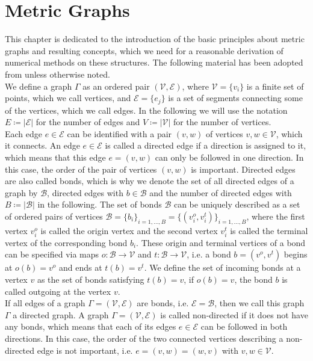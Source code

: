 \section{Metric Graphs}
\label{ch1:sec1}

This chapter is dedicated to the introduction of the basic principles about metric graphs and resulting concepts, which we need for a reasonable derivation of numerical methods on these structures. The following material has been adopted from \cite[chapter~1]{BerkolaikoKuchment:2013} unless otherwise noted. \\

We define a graph $\Gamma$ as an ordered pair $(\mathcal{V}, \mathcal{E})$, where $\mathcal{V} = \{v_i\}$ is a finite set of points, which we call vertices, and $\mathcal{E} = \{e_j\}$ is a set of segments connecting some of the vertices, which we call edges. In the following we will use the notation $E \coloneqq \left\lvert \mathcal{E} \right\rvert$ for the number of edges and $V \coloneqq \left\lvert \mathcal{V} \right\rvert$ for the number of vertices. \\
Each edge $e \in \mathcal{E}$ can be identified with a pair $(v, w)$ of vertices $v, w \in \mathcal{V}$, which it connects. An edge $e \in \mathcal{E}$ is called a directed edge if a direction is assigned to it, which means that this edge $e = (v, w)$ can only be followed in one direction. In this case, the order of the pair of vertices $(v, w)$ is important. Directed edges are also called bonds, which is why we denote the set of all directed edges of a graph by $\mathcal{B}$, directed edges with $b \in \mathcal{B}$ and the number of directed edges with $B \coloneqq \left\lvert \mathcal{B} \right\rvert$ in the following. The set of bonds $\mathcal{B}$ can be uniquely described as a set of ordered pairs of vertices $\mathcal{B} = \{b_i\}_{i = 1, \ldots, B} = \{(v^{o}_{i}, v^{t}_{i})\}_{i = 1, \ldots, B}$, where the first vertex $v^{o}_{i}$ is called the origin vertex and the second vertex $v^{t}_{i}$ is called the terminal vertex of the corresponding bond $b_i$. These origin and terminal vertices of a bond can be specified via maps $o \colon \mathcal{B} \to \mathcal{V}$ and $t \colon \mathcal{B} \to \mathcal{V}$, i.e. a bond $b = (v^{o}, v^{t})$ begins at $o(b) = v^{o}$ and ends at $t(b) = v^{t}$. We define the set of incoming bonds at a vertex $v$ as the set of bonds satisfying $t(b) = v$, if $o(b) = v$, the bond $b$ is called outgoing at the vertex $v$. \\
If all edges of a graph $\Gamma = (\mathcal{V}, \mathcal{E})$ are bonds, i.e. $\mathcal{E} = \mathcal{B}$, then we call this graph $\Gamma$ a directed graph. A graph $\Gamma = (\mathcal{V}, \mathcal{E})$ is called non-directed if it does not have any bonds, which means that each of its edges $e \in \mathcal{E}$ can be followed in both directions. In this case, the order of the two connected vertices describing a non-directed edge is not important, i.e. $e = (v, w) = (w, v)$ with $v, w \in \mathcal{V}$. \\
